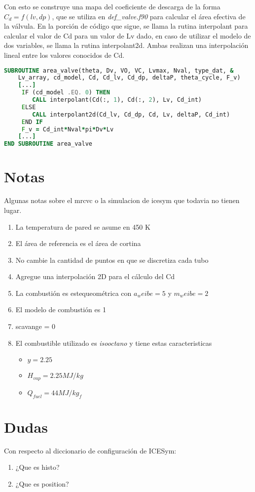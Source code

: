 Con esto se construye una mapa del coeficiente de descarga de la forma $C_d =
f(lv, dp)$, que se utiliza en \emph{def\_valve.f90} para calcular el área
efectiva de la válvula.
%
En la porción de código que sigue, se llama la rutina interpolant para calcular
el valor de Cd para un valor de Lv dado, en caso de utilizar el modelo de dos
variables, se llama la rutina interpolant2d.
%
Ambas realizan una interpolación lineal entre los valores conocidos de Cd.


\begin{lstlisting}[language=fortran]
SUBROUTINE area_valve(theta, Dv, VO, VC, Lvmax, Nval, type_dat, &
    Lv_array, cd_model, Cd, Cd_lv, Cd_dp, deltaP, theta_cycle, F_v)
    [...]
     IF (cd_model .EQ. 0) THEN
        CALL interpolant(Cd(:, 1), Cd(:, 2), Lv, Cd_int)
     ELSE
        CALL interpolant2d(Cd_lv, Cd_dp, Cd, Lv, deltaP, Cd_int)
     END IF
     F_v = Cd_int*Nval*pi*Dv*Lv
    [...]
END SUBROUTINE area_valve
\end{lstlisting}


\section{Notas}
Algunas notas sobre el mrcvc o la simulacion de icesym que todavia no tienen
lugar.

\begin{enumerate}
    \item La temperatura de pared se asume en 450 K
    \item El área de referencia es el área de cortina
    \item No cambie la cantidad de puntos en que se discretiza cada tubo
    \item Agregue una interpolación 2D para el cálculo del Cd
    \item La combustión es estequeométrica con $a_weibe=5$ y $m_weibe=2$
    \item El modelo de combustión es 1
    \item scavange = 0
    \item El combustible utilizado es \emph{isooctano} y tiene estas
        caracteristicas 
        \begin{itemize}
            \item $y = 2.25$
            \item $H_{vap} = 2.25 MJ/kg$
            \item $Q_{fuel} = 44 MJ/kg_f$
        \end{itemize}
\end{enumerate}

\section{Dudas}
Con respecto al diccionario de configuración de ICESym:

\begin{enumerate}
    \item ¿Que es histo?
    \item ¿Que es position?
\end{enumerate}
